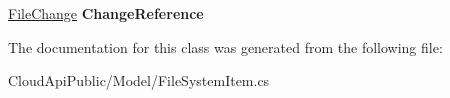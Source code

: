 \begin{DoxyCompactItemize}
\item 
\hypertarget{class_cloud_api_public_1_1_model_1_1_file_system_item_ad7096c94139bcbbf4b67a4b8027f904d}{\hyperlink{class_cloud_api_public_1_1_model_1_1_file_change}{File\-Change} {\bfseries Change\-Reference}}\label{class_cloud_api_public_1_1_model_1_1_file_system_item_ad7096c94139bcbbf4b67a4b8027f904d}

\end{DoxyCompactItemize}


The documentation for this class was generated from the following file\-:\begin{DoxyCompactItemize}
\item 
Cloud\-Api\-Public/\-Model/File\-System\-Item.\-cs\end{DoxyCompactItemize}

